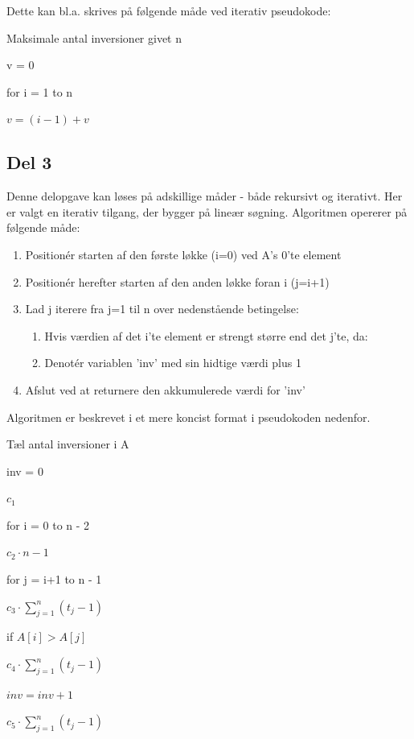 \documentclass[a4paper,10pt]{article}
\begin{document}
Dette kan bl.a. skrives på følgende måde ved iterativ pseudokode:

\begin{algorithm}
\caption{Maksimale antal inversioner givet n}
\begin{algorithmic}[1]
\State \parbox[t]{.7\linewidth}{v = 0}
\State \parbox[t]{.7\linewidth}{for i = 1 to n}
\Indent
\State \parbox[t]{.7\linewidth}{$v = (i-1) + v$}
\EndIndent
\State {}
\EndFunction
\end{algorithmic}
\end{algorithm}

\subsection*{Del 3}

Denne delopgave kan løses på adskillige måder - både rekursivt og iterativt. Her er valgt en iterativ tilgang, der bygger på lineær søgning. Algoritmen opererer på følgende måde:

\begin{enumerate}
\item{Positionér starten af den første løkke (i=0) ved A's 0'te element}
\item{Positionér herefter starten af den anden løkke foran i (j=i+1)}
\item{Lad j iterere fra j=1 til n over nedenstående betingelse:}
\begin{enumerate}
\item{Hvis værdien af det i'te element er strengt større end det j'te, da:}
\item{Denotér variablen 'inv' med sin hidtige værdi plus 1}
\end{enumerate}
\item{Afslut ved at returnere den akkumulerede værdi for 'inv'}
\end{enumerate}

\pagebreak

Algoritmen er beskrevet i et mere koncist format i pseudokoden nedenfor. 

\begin{algorithm}
\caption{Tæl antal inversioner i A}
\begin{algorithmic}[2]
\State \parbox[t]{.7\linewidth}{inv = 0}\parbox[t]{.7\linewidth}{$c_1$}
\State \parbox[t]{.7\linewidth}{for i = 0 to n - 2}\parbox[t]{.7\linewidth}{$c_2\cdot{n-1}$}
\Indent
\State \parbox[t]{.7\linewidth}{for j = i+1 to n - 1}\parbox[t]{.7\linewidth}{$c_3\cdot{\sum_{j=1}^{n}(t_j-1)}$}
\Indent
\State \parbox[t]{.7\linewidth}{if $A[i] > A[j]$}\parbox[t]{.7\linewidth}{$c_4\cdot{\sum_{j=1}^{n}(t_j-1)}$}
\State \parbox[t]{.7\linewidth}{$inv = inv + 1$}\parbox[t]{.7\linewidth}{$c_5\cdot{\sum_{j=1}^{n}(t_j-1)}$}
\EndIndent
\EndIndent
\State {}
\EndFunction
\end{algorithmic}
\end{algorithm}
\end{document}
